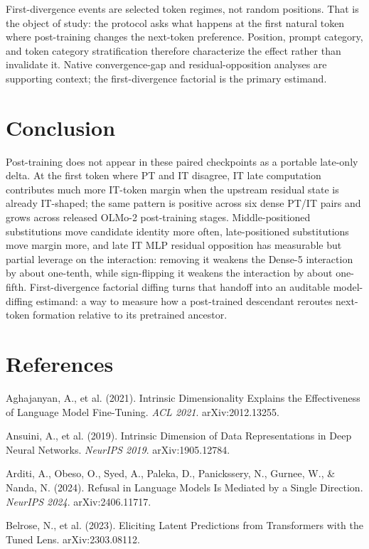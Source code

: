 \documentclass[11pt]{article}
\begin{document}
First-divergence events are selected token regimes, not random positions. That is the object of study: the protocol asks what happens at the first natural token where post-training changes the next-token preference. Position, prompt category, and token category stratification therefore characterize the effect rather than invalidate it. Native convergence-gap and residual-opposition analyses are supporting context; the first-divergence factorial is the primary estimand.

\section{Conclusion}

Post-training does not appear in these paired checkpoints as a portable late-only delta. At the first token where PT and IT disagree, IT late computation contributes much more IT-token margin when the upstream residual state is already IT-shaped; the same pattern is positive across six dense PT/IT pairs and grows across released OLMo-2 post-training stages. Middle-positioned substitutions move candidate identity more often, late-positioned substitutions move margin more, and late IT MLP residual opposition has measurable but partial leverage on the interaction: removing it weakens the Dense-5 interaction by about one-tenth, while sign-flipping it weakens the interaction by about one-fifth. First-divergence factorial diffing turns that handoff into an auditable model-diffing estimand: a way to measure how a post-trained descendant reroutes next-token formation relative to its pretrained ancestor.


\section*{References}

Aghajanyan, A., et al. (2021). Intrinsic Dimensionality Explains the Effectiveness of Language Model Fine-Tuning. \emph{ACL 2021}. arXiv:2012.13255.

Ansuini, A., et al. (2019). Intrinsic Dimension of Data Representations in Deep Neural Networks. \emph{NeurIPS 2019}. arXiv:1905.12784.

Arditi, A., Obeso, O., Syed, A., Paleka, D., Panickssery, N., Gurnee, W., \& Nanda, N. (2024). Refusal in Language Models Is Mediated by a Single Direction. \emph{NeurIPS 2024}. arXiv:2406.11717.

Belrose, N., et al. (2023). Eliciting Latent Predictions from Transformers with the Tuned Lens. arXiv:2303.08112.
\end{document}
